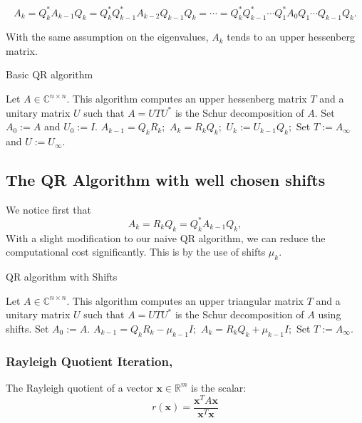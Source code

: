 \documentclass[12pt]{article}
\begin{document}
	\begin{equation}
		A_k = Q_k^* A_{k-1} Q_k = Q_k^* Q_{k-1}^* A_{k-2} Q_{k-1} Q_k = \cdots = Q_k^* Q_{k-1}^* \cdots Q_1^* A_0 Q_1 \cdots Q_{k-1} Q_k.
	\end{equation}
	
	With the same assumption on the eigenvalues, $A_k$ tends to an upper hessenberg matrix.
	
	\begin{algorithm}[H]
		\caption{Basic QR algorithm}
		\label{alg:basic_qr}
		\begin{algorithmic}[1]
			\Require Let $A \in \mathbb{C}^{n \times n}$. This algorithm computes an upper hessenberg matrix $T$ and a unitary matrix $U$ such that $A = UTU^*$ is the Schur decomposition of $A$.
			\State Set $A_0 := A$ and $U_0 := I$.
			\State $A_{k-1} = Q_k R_k;$ 
			\State $A_k = R_k Q_k;$
			\State $U_k := U_{k-1} Q_k;$ 
			\EndFor
			\State Set $T := A_{\infty}$ and $U := U_{\infty}.$
		\end{algorithmic}
	\end{algorithm}
	\subsection{The QR Algorithm with well chosen shifts}
	We notice first that
	\begin{equation}
		A_k = R_k Q_k = Q_k^* A_{k-1} Q_k,
	\end{equation}
	With a slight modification to our naive QR algorithm, we can reduce the computational cost significantly. This is by the use of shifts $\mu_k$.
	
	\begin{algorithm}[H]
		\caption{QR algorithm with Shifts}
		\begin{algorithmic}[1]
			\Require Let $A \in \mathbb{C}^{n \times n}$. This algorithm computes an upper triangular matrix $T$ and a unitary matrix $U$ such that $A = UTU^*$ is the Schur decomposition of $A$ using shifts.
			\State Set $A_0 := A$.
			\State $A_{k-1} = Q_k R_k - \mu_{k-1} I;$ 
			\State $A_k = R_k Q_k + \mu_{k-1} I;$
			\EndFor
			\State Set $T := A_{\infty}.$
		\end{algorithmic}
	\end{algorithm}
	\subsubsection{Rayleigh Quotient Iteration\cite{9}, \cite{10}}
	The Rayleigh quotient of a vector $\mathbf{x} \in \mathbb{R}^m$ is the scalar:
	\begin{equation}
		r(\mathbf{x}) = \frac{\mathbf{x}^T A \mathbf{x}}{\mathbf{x}^T \mathbf{x}} \label{eq:rayleigh_quotient}
	\end{equation}
	
\end{document}
